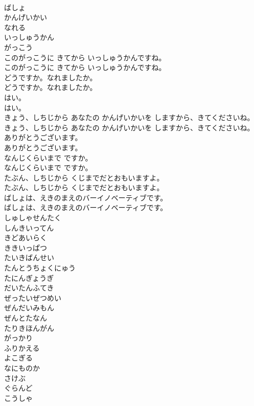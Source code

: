\documentclass[8pt]{extreport}
\begin{document}
\begin{CJK}{UTF8}{min}
\\	ばしょ
\\	かんげいかい
\\	なれる
\\	いっしゅうかん
\\	がっこう
\\	このがっこうに きてから いっしゅうかんですね。
\\	このがっこうに きてから いっしゅうかんですね。
\\	どうですか。なれましたか。
\\	どうですか。なれましたか。
\\	はい。
\\	はい。
\\	きょう、しちじから あなたの かんげいかいを しますから、きてくださいね。
\\	きょう、しちじから あなたの かんげいかいを しますから、きてくださいね。
\\	ありがとうございます。
\\	ありがとうございます。
\\	なんじくらいまで ですか。
\\	なんじくらいまで ですか。
\\	たぶん、しちじから くじまでだとおもいますよ。
\\	たぶん、しちじから くじまでだとおもいますよ。
\\	ばしょは、えきのまえのバーイノベーティブです。
\\	ばしょは、えきのまえのバーイノベーティブです。
\\	しゅしゃせんたく
\\	しんきいってん
\\	きどあいらく
\\	ききいっぱつ
\\	たいきばんせい
\\	たんとうちょくにゅう
\\	たにんぎょうぎ
\\	だいたんふてき
\\	ぜったいぜつめい
\\	ぜんだいみもん
\\	ぜんとたなん
\\	たりきほんがん
\\	がっかり
\\	ふりかえる
\\	よこぎる
\\	なにものか
\\	さけぶ
\\	ぐらんど
\\	こうしゃ

\end{CJK}
\end{document}
